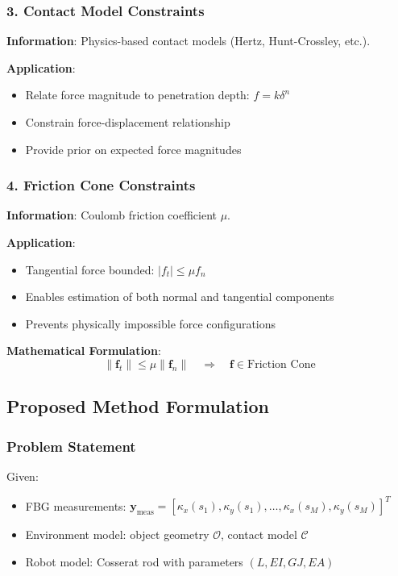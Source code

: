 \documentclass[11pt]{article}
\begin{document}
\subsubsection{3. Contact Model Constraints}

\textbf{Information}: Physics-based contact models (Hertz, Hunt-Crossley, etc.).

\textbf{Application}:
\begin{itemize}
    \item Relate force magnitude to penetration depth: $f = k \delta^n$
    \item Constrain force-displacement relationship
    \item Provide prior on expected force magnitudes
\end{itemize}

\subsubsection{4. Friction Cone Constraints}

\textbf{Information}: Coulomb friction coefficient $\mu$.

\textbf{Application}:
\begin{itemize}
    \item Tangential force bounded: $|f_t| \leq \mu f_n$
    \item Enables estimation of both normal and tangential components
    \item Prevents physically impossible force configurations
\end{itemize}

\textbf{Mathematical Formulation}:
\begin{equation}
\|\mathbf{f}_t\| \leq \mu \|\mathbf{f}_n\| \quad \Rightarrow \quad \mathbf{f} \in \text{Friction Cone}
\end{equation}

\subsection{Proposed Method Formulation}

\subsubsection{Problem Statement}

Given:
\begin{itemize}
    \item FBG measurements: $\mathbf{y}_{\text{meas}} = [\kappa_x(s_1), \kappa_y(s_1), \ldots, \kappa_x(s_M), \kappa_y(s_M)]^T$
    \item Environment model: object geometry $\mathcal{O}$, contact model $\mathcal{C}$
    \item Robot model: Cosserat rod with parameters $(L, EI, GJ, EA)$
\end{itemize}
\end{document}
